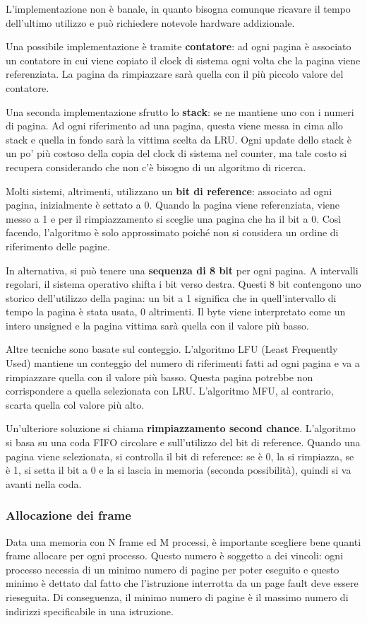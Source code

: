 \documentclass[a4]{article}
\begin{document}
L'implementazione non è banale, in quanto bisogna comunque ricavare il tempo dell'ultimo utilizzo e può richiedere notevole hardware addizionale.

Una possibile implementazione è tramite \textbf{contatore}: ad ogni pagina è associato un contatore in cui viene copiato il clock di sistema ogni volta che la pagina viene referenziata. La pagina da rimpiazzare sarà quella con il più piccolo valore del contatore.

Una seconda implementazione sfrutto lo \textbf{stack}: se ne mantiene uno con i numeri di pagina. Ad ogni riferimento ad una pagina, questa viene messa in cima allo stack e quella in fondo sarà la vittima scelta da LRU. Ogni update dello stack è un po' più costoso della copia del clock di sistema nel counter, ma tale costo si recupera considerando che non c'è bisogno di un algoritmo di ricerca.

Molti sistemi, altrimenti, utilizzano un \textbf{bit di reference}: associato ad ogni pagina, inizialmente è settato a 0. Quando la pagina viene referenziata, viene messo a 1 e per il rimpiazzamento si sceglie una pagina che ha il bit a 0. Così facendo, l'algoritmo è solo approssimato poiché non si considera un ordine di riferimento delle pagine.

In alternativa, si può tenere una \textbf{sequenza di 8 bit} per ogni pagina. A intervalli regolari, il sistema operativo shifta i bit verso destra. Questi 8 bit contengono uno storico dell'utilizzo della pagina: un bit a 1 significa che in quell'intervallo di tempo la pagina è stata usata, 0 altrimenti. Il byte viene interpretato come un intero unsigned e la pagina vittima sarà quella con il valore più basso.

Altre tecniche sono basate sul conteggio. L'algoritmo LFU (Least Frequently Used) mantiene un conteggio del numero di riferimenti fatti ad ogni pagina e va a rimpiazzare quella con il valore più basso. Questa pagina potrebbe non corrispondere a quella selezionata con LRU. L'algoritmo MFU, al contrario, scarta quella col valore più alto.

Un'ulteriore soluzione si chiama \textbf{rimpiazzamento second chance}. L'algoritmo si basa su una coda FIFO circolare e sull'utilizzo del bit di reference. Quando una pagina viene selezionata, si controlla il bit di reference: se è 0, la si rimpiazza, se è 1, si setta il bit a 0 e la si lascia in memoria (seconda possibilità), quindi si va avanti nella coda.

\subsubsection{Allocazione dei frame}
Data una memoria con N frame ed M processi, è importante scegliere bene quanti frame allocare per ogni processo. Questo numero è soggetto a dei vincoli: ogni processo necessia di un minimo numero di pagine per poter eseguito e questo minimo è dettato dal fatto che l'istruzione interrotta da un page fault deve essere rieseguita. Di conseguenza, il minimo numero di pagine è il massimo numero di indirizzi specificabile in una istruzione.
\end{document}
